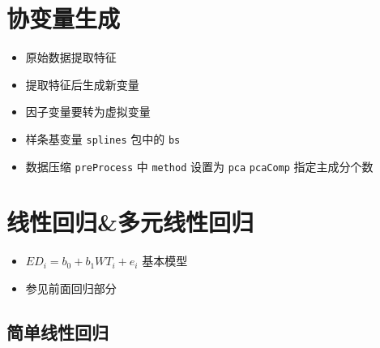 \documentclass[]{book}
\providecommand{\tightlist}{%
  \setlength{\itemsep}{0pt}\setlength{\parskip}{0pt}}
\begin{document}
\hypertarget{ux534fux53d8ux91cfux751fux6210}{%
\section{协变量生成}\label{ux534fux53d8ux91cfux751fux6210}}

\begin{itemize}
\tightlist
\item
  原始数据提取特征
\item
  提取特征后生成新变量
\item
  因子变量要转为虚拟变量
\item
  样条基变量 \texttt{splines} 包中的 \texttt{bs}
\item
  数据压缩 \texttt{preProcess} 中 \texttt{method} 设置为 \texttt{pca} \texttt{pcaComp} 指定主成分个数
\end{itemize}

\hypertarget{ux7ebfux6027ux56deux5f52ux591aux5143ux7ebfux6027ux56deux5f52}{%
\section{线性回归\&多元线性回归}\label{ux7ebfux6027ux56deux5f52ux591aux5143ux7ebfux6027ux56deux5f52}}

\begin{itemize}
\tightlist
\item
  \(ED_i = b_0 + b_1 WT_i + e_i\) 基本模型
\item
  参见前面回归部分
\end{itemize}

\hypertarget{ux7b80ux5355ux7ebfux6027ux56deux5f52}{%
\subsection{简单线性回归}\label{ux7b80ux5355ux7ebfux6027ux56deux5f52}}
\end{document}
